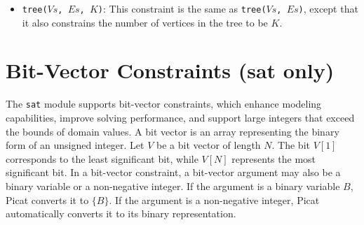 \begin{itemize}
\item \texttt{tree($Vs$, $Es$, $K$)}:  This constraint is the same as \texttt{tree($Vs$, $Es$)}, except that it also constrains the number of vertices in the tree to be $K$. 
\end{itemize}

\section{Bit-Vector Constraints (sat only)}
The \texttt{sat} module supports bit-vector constraints, which enhance modeling capabilities, improve solving performance, and support large integers that exceed the bounds of domain values. A bit vector is an array representing the binary form of an unsigned integer. Let $V$ be a bit vector of length $N$. The bit $V[1]$ corresponds to the least significant bit, while $V[N]$ represents the most significant bit. In a bit-vector constraint, a bit-vector argument may also be a binary variable or a non-negative integer. If the argument is a binary variable $B$, Picat converts it to $\{B\}$. If the argument is a non-negative integer, Picat automatically converts it to its binary representation. 

